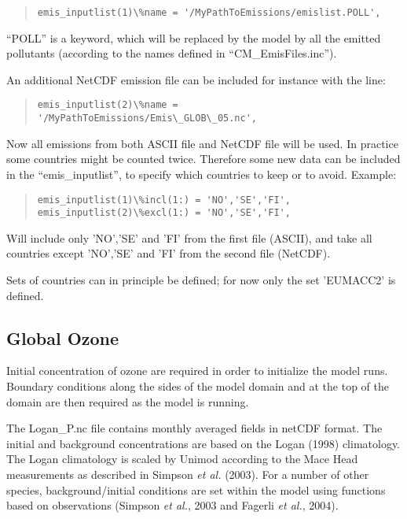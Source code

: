 \begin{quote} \begin{verbatim}
emis_inputlist(1)\%name = '/MyPathToEmissions/emislist.POLL',
\end{verbatim} \end{quote} 

``POLL'' is a keyword, which will be replaced by the model by all the emitted pollutants (according to the 
names defined in ``CM\_EmisFiles.inc'').

An additional NetCDF emission file can be included for instance with the line:
\begin{quote} \begin{verbatim}
emis_inputlist(2)\%name = '/MyPathToEmissions/Emis\_GLOB\_05.nc',
\end{verbatim} \end{quote} 

Now all emissions from both ASCII file and NetCDF file will be used. In practice some countries might be counted twice. Therefore some new data can be included in the ``emis\_inputlist'', to specify which countries to keep or to avoid. Example:

\begin{quote} \begin{verbatim}
emis_inputlist(1)\%incl(1:) = 'NO','SE','FI',
emis_inputlist(2)\%excl(1:) = 'NO','SE','FI',
\end{verbatim} \end{quote} 

Will include only 'NO','SE' and 'FI' from the first file (ASCII), and take all countries except 'NO','SE' and 'FI' from the second file (NetCDF).

Sets of countries can in principle be defined; for now only the set 'EUMACC2' is defined.

\subsection{Global Ozone}
Initial concentration of ozone are required in order to
initialize the model runs. Boundary conditions along the sides of the model
domain and at the top of the domain are then required as the model is
running.

The Logan\_P.nc file contains monthly averaged fields in netCDF format. 
The initial and background
concentrations are based on the Logan (1998) climatology. The Logan
climatology is scaled by Unimod according to the Mace Head measurements as
described in Simpson {\sl et al.} (2003). For a number of other species, 
background/initial conditions are set within the model using functions 
based on observations (Simpson {\sl et al.}, 2003 and Fagerli {\sl et al.}, 2004).

